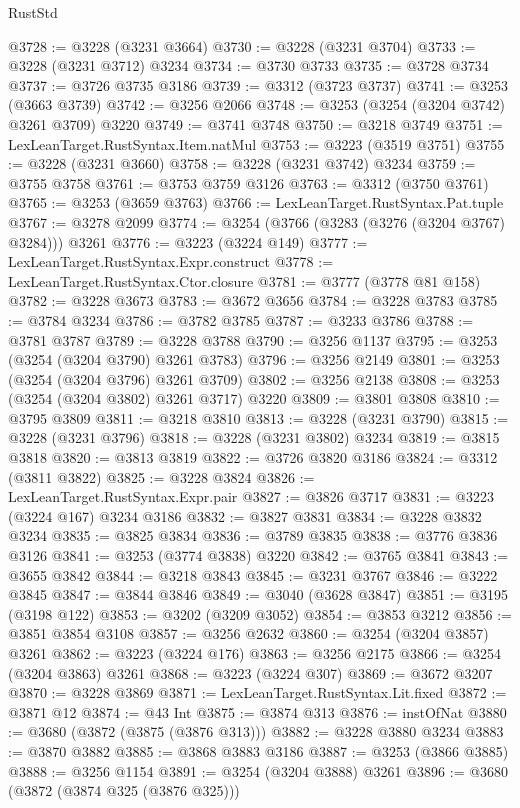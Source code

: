 \begin{lexlean}{RustStd}
\begin{coremodule}
@3728 := @3228 (@3231 @3664)
@3730 := @3228 (@3231 @3704)
@3733 := @3228 (@3231 @3712) @3234
@3734 := @3730 @3733
@3735 := @3728 @3734
@3737 := @3726 @3735 @3186
@3739 := @3312 (@3723 @3737)
@3741 := @3253 (@3663 @3739)
@3742 := @3256 @2066
@3748 := @3253 (@3254 (@3204 @3742) @3261 @3709) @3220
@3749 := @3741 @3748
@3750 := @3218 @3749
@3751 := LexLeanTarget.RustSyntax.Item.natMul
@3753 := @3223 (@3519 @3751)
@3755 := @3228 (@3231 @3660)
@3758 := @3228 (@3231 @3742) @3234
@3759 := @3755 @3758
@3761 := @3753 @3759 @3126
@3763 := @3312 (@3750 @3761)
@3765 := @3253 (@3659 @3763)
@3766 := LexLeanTarget.RustSyntax.Pat.tuple
@3767 := @3278 @2099
@3774 := @3254 (@3766 (@3283 (@3276 (@3204 @3767) @3284))) @3261
@3776 := @3223 (@3224 @149)
@3777 := LexLeanTarget.RustSyntax.Expr.construct
@3778 := LexLeanTarget.RustSyntax.Ctor.closure
@3781 := @3777 (@3778 @81 @158)
@3782 := @3228 @3673
@3783 := @3672 @3656
@3784 := @3228 @3783
@3785 := @3784 @3234
@3786 := @3782 @3785
@3787 := @3233 @3786
@3788 := @3781 @3787
@3789 := @3228 @3788
@3790 := @3256 @1137
@3795 := @3253 (@3254 (@3204 @3790) @3261 @3783)
@3796 := @3256 @2149
@3801 := @3253 (@3254 (@3204 @3796) @3261 @3709)
@3802 := @3256 @2138
@3808 := @3253 (@3254 (@3204 @3802) @3261 @3717) @3220
@3809 := @3801 @3808
@3810 := @3795 @3809
@3811 := @3218 @3810
@3813 := @3228 (@3231 @3790)
@3815 := @3228 (@3231 @3796)
@3818 := @3228 (@3231 @3802) @3234
@3819 := @3815 @3818
@3820 := @3813 @3819
@3822 := @3726 @3820 @3186
@3824 := @3312 (@3811 @3822)
@3825 := @3228 @3824
@3826 := LexLeanTarget.RustSyntax.Expr.pair
@3827 := @3826 @3717
@3831 := @3223 (@3224 @167) @3234 @3186
@3832 := @3827 @3831
@3834 := @3228 @3832 @3234
@3835 := @3825 @3834
@3836 := @3789 @3835
@3838 := @3776 @3836 @3126
@3841 := @3253 (@3774 @3838) @3220
@3842 := @3765 @3841
@3843 := @3655 @3842
@3844 := @3218 @3843
@3845 := @3231 @3767
@3846 := @3222 @3845
@3847 := @3844 @3846
@3849 := @3040 (@3628 @3847)
@3851 := @3195 (@3198 @122)
@3853 := @3202 (@3209 @3052)
@3854 := @3853 @3212
@3856 := @3851 @3854 @3108
@3857 := @3256 @2632
@3860 := @3254 (@3204 @3857) @3261
@3862 := @3223 (@3224 @176)
@3863 := @3256 @2175
@3866 := @3254 (@3204 @3863) @3261
@3868 := @3223 (@3224 @307)
@3869 := @3672 @3207
@3870 := @3228 @3869
@3871 := LexLeanTarget.RustSyntax.Lit.fixed
@3872 := @3871 @12
@3874 := @43 Int
@3875 := @3874 @313
@3876 := instOfNat
@3880 := @3680 (@3872 (@3875 (@3876 @313)))
@3882 := @3228 @3880 @3234
@3883 := @3870 @3882
@3885 := @3868 @3883 @3186
@3887 := @3253 (@3866 @3885)
@3888 := @3256 @1154
@3891 := @3254 (@3204 @3888) @3261
@3896 := @3680 (@3872 (@3874 @325 (@3876 @325)))

\end{coremodule}
\end{lexlean}
